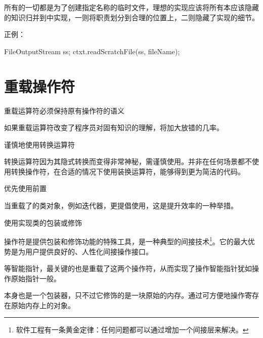 \begin{content}
所有的一切都是为了创建指定名称的临时文件，理想的实现应该将所有本应该隐藏的知识归并到中实现，一则将职责划分到合理的位置上，二则隐藏了实现的细节。

正例：
\begin{leftbar}
\begin{c++}[caption={应用迪米特法则}]
FileOutputStream ss;
ctxt.readScratchFile(ss, fileName);
\end{c++}
\end{leftbar}

\end{content}

\section{重载操作符}

\begin{content}

\begin{regulation}
重载运算符必须保持原有操作符的语义
\end{regulation}

如果重载运算符改变了程序员对固有知识的理解，将加大放错的几率。

\begin{regulation}
谨慎地使用转换运算符
\end{regulation}

转换运算符因为其隐式转换而变得非常神秘，需谨慎使用。并非在任何场景都不使用转换操作符，在合适的情况下使用装换运算符，能够得到更为简洁的代码。

\begin{regulation}
优先使用前置
\end{regulation}

当重载了的类对象，例如迭代器，更提倡使用，这是提升效率的一种举措。

\begin{regulation}
使用实现类的包装或修饰
\end{regulation}

操作符是提供包装和修饰功能的特殊工具，是一种典型的间接技术\footnote{软件工程有一条黄金定律：任何问题都可以通过增加一个间接层来解决。}。它的最大优势是为用户提供良好的、人性化间接操作接口。

等智能指针，最关键的也是重载了这两个操作符，从而实现了操作智能指针犹如操作原始指针一般。

本身也是一个包装器，只不过它修饰的是一块原始的内存。通过可方便地操作寄存在原始内存上的对象。


\end{content}
